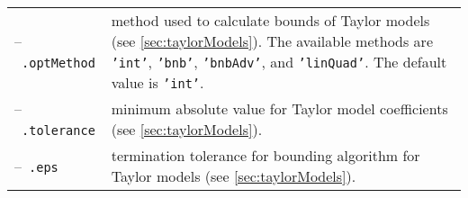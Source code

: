 \begin{table}
\begin{tabular}{ l p{11cm} }
--~\texttt{.optMethod} & method used to calculate bounds of Taylor models (see \cref{sec:taylorModels}). The available methods are \texttt{'int'}, \texttt{'bnb'}, \texttt{'bnbAdv'}, and \texttt{'linQuad'}. The default value is \texttt{'int'}. \\
--~\texttt{.tolerance} & minimum absolute value for Taylor model coefficients (see \cref{sec:taylorModels}). \\
--~\texttt{.eps} & termination tolerance for bounding algorithm for Taylor models (see \cref{sec:taylorModels}). \\
\bottomrule
\end{tabular}
\end{table}
